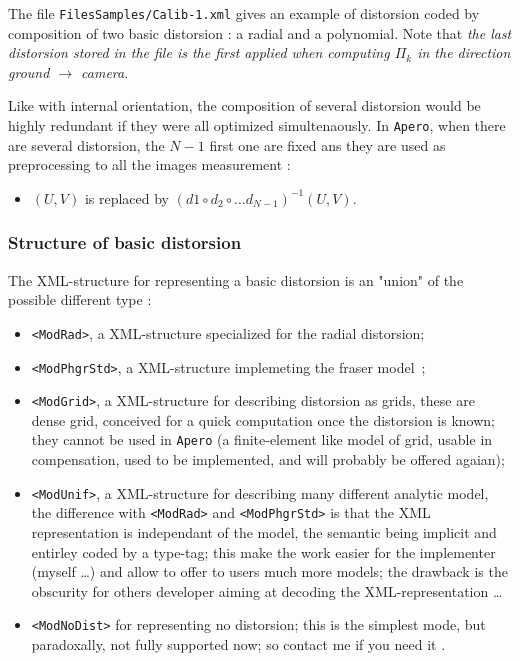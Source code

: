 The file {\tt FilesSamples/Calib-1.xml} gives an example of distorsion coded
by composition of two basic distorsion : a radial  and a polynomial. Note that
\emph{the last distorsion stored in the file  is the first applied when computing
$\Pi_k$ in the direction ground $\rightarrow$  camera}.

Like with internal orientation, the composition of several distorsion 
would be   highly redundant if they were all optimized simultenaously.
In {\tt Apero}, when there are several distorsion, the $N-1$ first one are
fixed ans they are used as preprocessing to all the images measurement :

\begin{itemize}
       \item $(U,V)$ is replaced by $(d1 \circ d_2 \circ \dots d_{N-1}) ^{-1}(U,V)$.
\end{itemize}


\subsubsection{Structure of basic distorsion}

The XML-structure for representing a basic distorsion is an "union" of the possible 
different type :

\begin{itemize}
   \item {\tt <ModRad>}, a XML-structure specialized for the radial distorsion;

   \item {\tt <ModPhgrStd>}, a XML-structure implemeting the fraser model~\cite{Fraser};

   \item {\tt <ModGrid>}, a XML-structure for describing distorsion as grids, these are dense
         grid, conceived for a quick computation once the distorsion is known; they cannot
         be used in {\tt Apero} (a finite-element like model of grid, usable in compensation,
         used  to be implemented, and will probably be offered agaian);

   \item {\tt <ModUnif>}, a XML-structure for describing many different analytic model, the 
         difference with {\tt <ModRad>} and {\tt <ModPhgrStd>} is that the XML representation
         is independant of the model, the semantic being implicit and entirley coded by a  type-tag; 
         this make the work easier for the implementer (myself \dots) and allow to offer to users
         much more models; the drawback is the obscurity for others developer aiming at decoding 
         the XML-representation \dots

   \item {\tt <ModNoDist>} for representing no distorsion; this is the simplest mode, but paradoxally,
         not fully supported now; so contact me if you need it .
\end{itemize}

